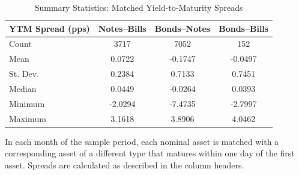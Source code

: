 \documentclass[11pt,a4paper,margin=1.5in]{article}
\begin{document}
\begin{table}
	\centering
	\setlength{\tabcolsep}{15pt}
    \renewcommand{\arraystretch}{1.2}
	\caption{Summary Statistics: Matched Yield-to-Maturity Spreads} \vspace{1em}
	\label{tab:Summary_Stats}
	\begin{threeparttable}
		\begin{tabular}{l c c c} \toprule
			YTM Spread (pps)	& Notes--Bills 	& Bonds--Notes 	& Bonds--Bills	\\ \midrule
			Count							& 3717			& 7052			& 152			\\
			Mean							& 0.0722		& -0.1747		& -0.0497		\\ 
			St. Dev.						& 0.2384		& 0.7133		& 0.7451		\\
			Median							& 0.0449		& -0.0264		& 0.0393		\\ 
			Minimum							& -2.0294		& -7.4735		& -2.7997		\\ 
			Maximum							& 3.1618		& 3.8906		& 4.0462		\\ \bottomrule
		\end{tabular}
		\begin{tablenotes}
			\item \footnotesize{In each month of the sample period, each nominal asset is matched with a corresponding asset of a different type that matures within one day of the first asset.
			Spreads are calculated as described in the column headers.}
		\end{tablenotes}	
	\end{threeparttable}
\end{table}
\end{document}
